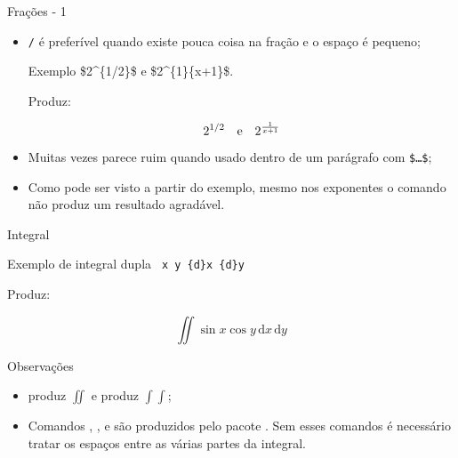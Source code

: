 \begin{frame}{Frações - 1}
	\begin{itemize}
	    \pause
		\item \texttt{/} é preferível quando existe pouca coisa na fração e o espaço é pequeno;
		    \pause
			\begin{Codigo}{Exemplo}
				\$2\string^\{1/2\}\$ e \$2\string^\string\frac\{1\}\{x+1\}\$.
			\end{Codigo}

            \pause
			Produz:

			\begin{Resultado}{}
				\[2^{1/2} \text{\quad e\quad} 2^\frac{1}{x+1}\]
			\end{Resultado}

		\medskip

        \pause
		\item Muitas vezes \texttt{\string\frac} parece ruim quando usado dentro de um parágrafo com \texttt{\$\dots\$};
		\pause
		\item Como pode ser visto a partir do exemplo, mesmo nos exponentes o comando  não produz um resultado agradável.
	\end{itemize}
\end{frame}

\begin{frame}{Integral}
	\begin{Codigo}{Exemplo de integral dupla}
		\texttt{\string\iint\string\sin\ x\string\cos\ y\string\,\string\mathrm\{d\}x\string\,\string\mathrm\{d\}y}
	\end{Codigo}

    \pause
	Produz:

	\begin{Resultado}{}
		\[\iint \sin x\cos y\,\mathrm{d}x\,\mathrm{d}y\]
	\end{Resultado}

    \pause
	\begin{Observacao}{Observações}
		\begin{itemize}
			\item \texttt{\string\iint} produz $\displaystyle\iint$ e \texttt{\string\int\string\int} produz $\displaystyle\int\int$;
			\pause
			\item Comandos , ,  e  são produzidos pelo pacote . Sem esses comandos é necessário tratar os espaços entre as várias partes da integral.
		\end{itemize}
	\end{Observacao}
\end{frame}

